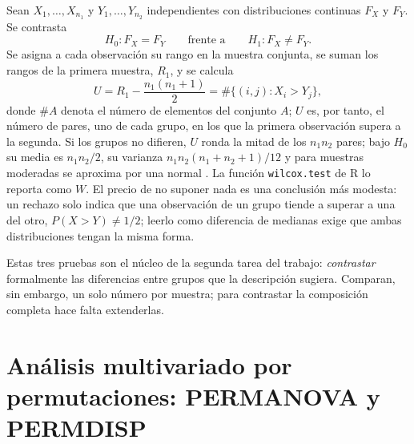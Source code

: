 Sean $X_1, \dots, X_{n_1}$ y $Y_1, \dots, Y_{n_2}$ independientes con distribuciones continuas $F_X$ y
$F_Y$. Se contrasta
\begin{equation}
H_{0} : F_X = F_Y \qquad \text{frente a} \qquad H_{1} : F_X \neq F_Y.
\label{eq:hip-rangos}
\end{equation}
Se asigna a cada observación su rango en la muestra conjunta, se suman los rangos de la primera
muestra, $R_1$, y se calcula
\begin{equation}
U = R_1 - \frac{n_1(n_1+1)}{2} = \#\{(i, j) : X_i > Y_j\},
\label{eq:mann-whitney}
\end{equation}
donde $\#A$ denota el número de elementos del conjunto $A$; $U$ es, por tanto, el número de pares,
uno de cada grupo, en los que la primera observación supera a la segunda. Si los
grupos no difieren, $U$ ronda la mitad de los $n_1 n_2$ pares; bajo $H_0$ su media es $n_1 n_2 / 2$,
su varianza $n_1 n_2 (n_1 + n_2 + 1)/12$ y para muestras moderadas se aproxima por una normal
\citep{wilcox2010fundamentals}. La función \texttt{wilcox.test} de R lo reporta como $W$. El precio
de no suponer nada es una conclusión más modesta: un rechazo solo indica que una observación de un
grupo tiende a superar a una del otro, $P(X > Y) \neq 1/2$; leerlo como diferencia de medianas exige
que ambas distribuciones tengan la misma forma.

Estas tres pruebas son el núcleo de la segunda tarea del trabajo: \emph{contrastar} formalmente las
diferencias entre grupos que la descripción sugiera. Comparan, sin embargo, un solo número por
muestra; para contrastar la composición completa hace falta extenderlas.

\section[PERMANOVA y PERMDISP]{Análisis multivariado por permutaciones: PERMANOVA y PERMDISP}
\label{sec:permanova}

